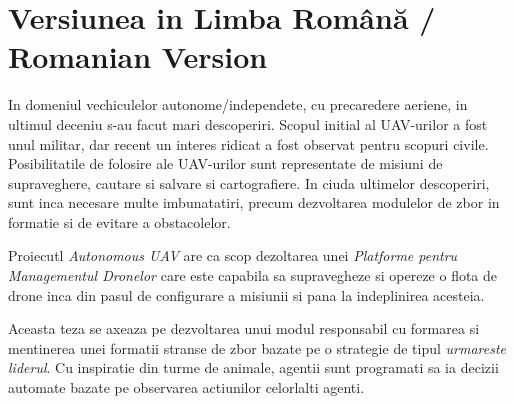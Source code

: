 
\section{Versiunea in Limba Română / Romanian Version}

In domeniul vechiculelor autonome/independete, cu precaredere aeriene, in ultimul
deceniu s-au facut mari descoperiri. Scopul initial al UAV-urilor a fost unul
militar, dar recent un interes ridicat a fost observat pentru scopuri civile.
Posibilitatile de folosire ale UAV-urilor sunt representate de misiuni de 
supraveghere, cautare si salvare si cartografiere. In ciuda ultimelor descoperiri, 
sunt inca necesare multe imbunatatiri, precum dezvoltarea modulelor de 
zbor in formatie si de evitare a obstacolelor.

Proiecutl  \textit{Autonomous UAV} are ca scop dezoltarea unei
\textit{Platforme pentru Managementul Dronelor} care este capabila sa supravegheze
si opereze o flota de drone inca din pasul de configurare a misiunii si pana la
indeplinirea acesteia.

Aceasta teza se axeaza pe dezvoltarea unui modul responsabil cu formarea si mentinerea
unei formatii stranse de zbor bazate pe o strategie de tipul \textit{urmareste
liderul}. Cu inspiratie din turme de animale,  agentii sunt programati sa ia
decizii automate bazate pe observarea actiunilor celorlalti agenti.


